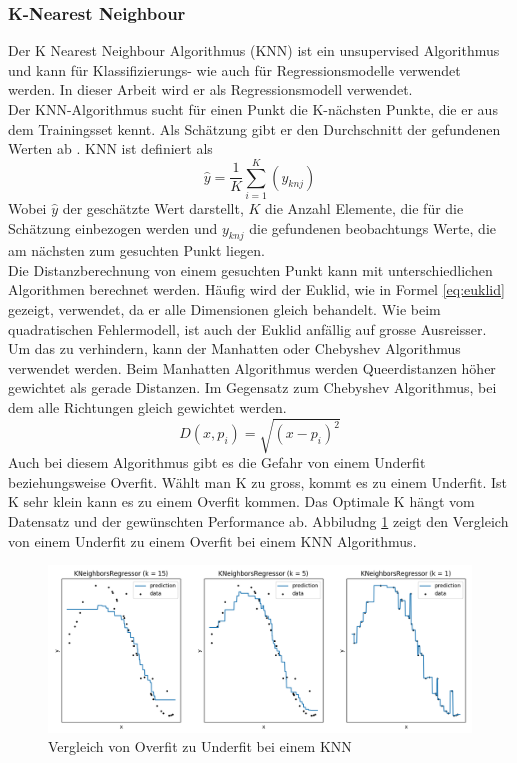 \subsubsection{K-Nearest Neighbour}
Der K Nearest Neighbour Algorithmus (KNN) ist ein unsupervised Algorithmus und kann für Klassifizierungs- wie auch für Regressionsmodelle verwendet werden. In dieser Arbeit wird er als Regressionsmodell verwendet.\\
Der KNN-Algorithmus sucht für einen Punkt die K-nächsten Punkte, die er aus dem Trainingsset kennt. Als Schätzung gibt er den Durchschnitt der gefundenen Werten ab \cite{knn_1}.
KNN ist definiert als
\begin{equation}
\label{eq:lasso}
\hat{y} = \frac{1}{K} \sum_{i=1}^{K} (y_{knj})
\end{equation}
%
Wobei $\hat{y}$ der geschätzte Wert darstellt, $K$ die Anzahl Elemente, die für die Schätzung einbezogen werden und $y_{knj}$ die gefundenen beobachtungs Werte, die am nächsten zum gesuchten Punkt liegen.\\
Die Distanzberechnung von einem gesuchten Punkt kann mit unterschiedlichen Algorithmen berechnet werden. Häufig wird der Euklid, wie in Formel \eqref{eq:euklid} gezeigt, verwendet, da er alle Dimensionen gleich behandelt. Wie beim quadratischen Fehlermodell, ist auch der Euklid anfällig auf grosse Ausreisser. Um das zu verhindern, kann der Manhatten oder Chebyshev Algorithmus verwendet werden. Beim Manhatten Algorithmus werden Queerdistanzen höher gewichtet als gerade Distanzen. Im Gegensatz zum Chebyshev Algorithmus, bei dem alle Richtungen gleich gewichtet werden.
\begin{equation}
\label{eq:euklid}
D(x, p_i) = \sqrt{(x - p_i)^2}
\end{equation}
%
\newline
Auch bei diesem Algorithmus gibt es die Gefahr von einem Underfit beziehungsweise Overfit. Wählt man K zu gross, kommt es zu einem Underfit. Ist K sehr klein kann es zu einem Overfit kommen. Das Optimale K hängt vom Datensatz und der gewünschten Performance ab. Abbiludng \ref{fig:under_overfit_knn} zeigt den Vergleich von einem Underfit zu einem Overfit bei einem KNN Algorithmus.\\[2ex]
\begin{figure}[ht]
\centering
\includegraphics[width=\textwidth]{images/knears_overfit.png}
\caption[Vergleich von Overfit zu Underfit bei einem KNN]{Vergleich von Overfit zu Underfit bei einem KNN}%
\label{fig:under_overfit_knn}
\end{figure}
